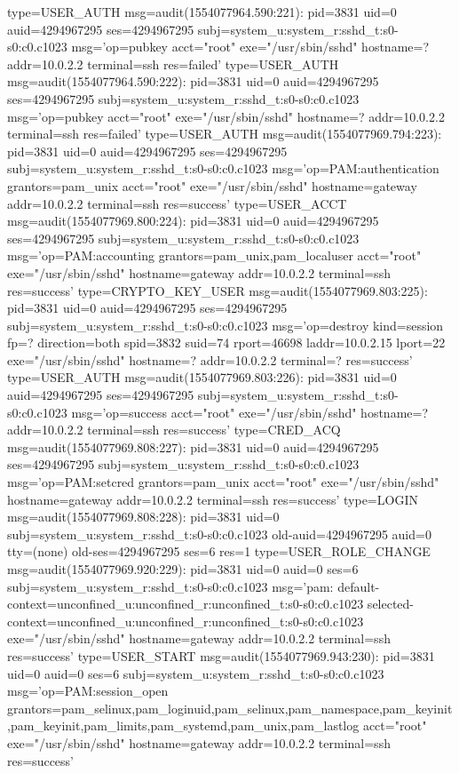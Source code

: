 \documentclass[]{report}
\newenvironment{Shaded}{}{}
\newcommand{\NormalTok}[1]{#1}
\begin{document}
\begin{Shaded}
\begin{Highlighting}[]
\NormalTok{type=USER_AUTH msg=audit(1554077964.590:221): pid=3831 uid=0 auid=4294967295 ses=4294967295 subj=system_u:system_r:sshd_t:s0-s0:c0.c1023 msg='op=pubkey acct="root" exe="/usr/sbin/sshd" hostname=? addr=10.0.2.2 terminal=ssh res=failed'}
\NormalTok{type=USER_AUTH msg=audit(1554077964.590:222): pid=3831 uid=0 auid=4294967295 ses=4294967295 subj=system_u:system_r:sshd_t:s0-s0:c0.c1023 msg='op=pubkey acct="root" exe="/usr/sbin/sshd" hostname=? addr=10.0.2.2 terminal=ssh res=failed'}
\NormalTok{type=USER_AUTH msg=audit(1554077969.794:223): pid=3831 uid=0 auid=4294967295 ses=4294967295 subj=system_u:system_r:sshd_t:s0-s0:c0.c1023 msg='op=PAM:authentication grantors=pam_unix acct="root" exe="/usr/sbin/sshd" hostname=gateway addr=10.0.2.2 terminal=ssh res=success'}
\NormalTok{type=USER_ACCT msg=audit(1554077969.800:224): pid=3831 uid=0 auid=4294967295 ses=4294967295 subj=system_u:system_r:sshd_t:s0-s0:c0.c1023 msg='op=PAM:accounting grantors=pam_unix,pam_localuser acct="root" exe="/usr/sbin/sshd" hostname=gateway addr=10.0.2.2 terminal=ssh res=success'}
\NormalTok{type=CRYPTO_KEY_USER msg=audit(1554077969.803:225): pid=3831 uid=0 auid=4294967295 ses=4294967295 subj=system_u:system_r:sshd_t:s0-s0:c0.c1023 msg='op=destroy kind=session fp=? direction=both spid=3832 suid=74 rport=46698 laddr=10.0.2.15 lport=22  exe="/usr/sbin/sshd" hostname=? addr=10.0.2.2 terminal=? res=success'}
\NormalTok{type=USER_AUTH msg=audit(1554077969.803:226): pid=3831 uid=0 auid=4294967295 ses=4294967295 subj=system_u:system_r:sshd_t:s0-s0:c0.c1023 msg='op=success acct="root" exe="/usr/sbin/sshd" hostname=? addr=10.0.2.2 terminal=ssh res=success'}
\NormalTok{type=CRED_ACQ msg=audit(1554077969.808:227): pid=3831 uid=0 auid=4294967295 ses=4294967295 subj=system_u:system_r:sshd_t:s0-s0:c0.c1023 msg='op=PAM:setcred grantors=pam_unix acct="root" exe="/usr/sbin/sshd" hostname=gateway addr=10.0.2.2 terminal=ssh res=success'}
\NormalTok{type=LOGIN msg=audit(1554077969.808:228): pid=3831 uid=0 subj=system_u:system_r:sshd_t:s0-s0:c0.c1023 old-auid=4294967295 auid=0 tty=(none) old-ses=4294967295 ses=6 res=1}
\NormalTok{type=USER_ROLE_CHANGE msg=audit(1554077969.920:229): pid=3831 uid=0 auid=0 ses=6 subj=system_u:system_r:sshd_t:s0-s0:c0.c1023 msg='pam: default-context=unconfined_u:unconfined_r:unconfined_t:s0-s0:c0.c1023 selected-context=unconfined_u:unconfined_r:unconfined_t:s0-s0:c0.c1023 exe="/usr/sbin/sshd" hostname=gateway addr=10.0.2.2 terminal=ssh res=success'}
\NormalTok{type=USER_START msg=audit(1554077969.943:230): pid=3831 uid=0 auid=0 ses=6 subj=system_u:system_r:sshd_t:s0-s0:c0.c1023 msg='op=PAM:session_open grantors=pam_selinux,pam_loginuid,pam_selinux,pam_namespace,pam_keyinit,pam_keyinit,pam_limits,pam_systemd,pam_unix,pam_lastlog acct="root" exe="/usr/sbin/sshd" hostname=gateway addr=10.0.2.2 terminal=ssh res=success'}

\end{Highlighting}
\end{Shaded}
\end{document}
